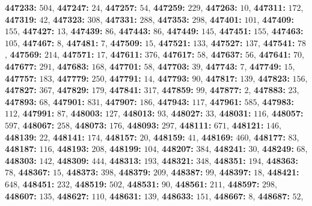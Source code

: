 \textsf{\bfseries 447233:} $504$, \textsf{\bfseries 447247:} $24$, \textsf{\bfseries 447257:} $54$, \textsf{\bfseries 447259:} $229$, \textsf{\bfseries 447263:} $10$, \textsf{\bfseries 447311:} $172$, \textsf{\bfseries 447319:} $42$, \textsf{\bfseries 447323:} $308$, \textsf{\bfseries 447331:} $288$, \textsf{\bfseries 447353:} $298$, \textsf{\bfseries 447401:} $101$, \textsf{\bfseries 447409:} $155$, \textsf{\bfseries 447427:} $13$, \textsf{\bfseries 447439:} $86$, \textsf{\bfseries 447443:} $86$, \textsf{\bfseries 447449:} $145$, \textsf{\bfseries 447451:} $155$, \textsf{\bfseries 447463:} $105$, \textsf{\bfseries 447467:} $8$, \textsf{\bfseries 447481:} $7$, \textsf{\bfseries 447509:} $15$, \textsf{\bfseries 447521:} $133$, \textsf{\bfseries 447527:} $137$, \textsf{\bfseries 447541:} $78$, \textsf{\bfseries 447569:} $214$, \textsf{\bfseries 447571:} $17$, \textsf{\bfseries 447611:} $376$, \textsf{\bfseries 447617:} $58$, \textsf{\bfseries 447637:} $56$, \textsf{\bfseries 447641:} $70$, \textsf{\bfseries 447677:} $291$, \textsf{\bfseries 447683:} $168$, \textsf{\bfseries 447701:} $58$, \textsf{\bfseries 447703:} $39$, \textsf{\bfseries 447743:} $7$, \textsf{\bfseries 447749:} $15$, \textsf{\bfseries 447757:} $183$, \textsf{\bfseries 447779:} $250$, \textsf{\bfseries 447791:} $14$, \textsf{\bfseries 447793:} $90$, \textsf{\bfseries 447817:} $139$, \textsf{\bfseries 447823:} $156$, \textsf{\bfseries 447827:} $367$, \textsf{\bfseries 447829:} $179$, \textsf{\bfseries 447841:} $317$, \textsf{\bfseries 447859:} $99$, \textsf{\bfseries 447877:} $2$, \textsf{\bfseries 447883:} $23$, \textsf{\bfseries 447893:} $68$, \textsf{\bfseries 447901:} $831$, \textsf{\bfseries 447907:} $186$, \textsf{\bfseries 447943:} $117$, \textsf{\bfseries 447961:} $585$, \textsf{\bfseries 447983:} $112$, \textsf{\bfseries 447991:} $87$, \textsf{\bfseries 448003:} $127$, \textsf{\bfseries 448013:} $93$, \textsf{\bfseries 448027:} $33$, \textsf{\bfseries 448031:} $116$, \textsf{\bfseries 448057:} $597$, \textsf{\bfseries 448067:} $258$, \textsf{\bfseries 448073:} $176$, \textsf{\bfseries 448093:} $297$, \textsf{\bfseries 448111:} $671$, \textsf{\bfseries 448121:} $146$, \textsf{\bfseries 448139:} $22$, \textsf{\bfseries 448141:} $174$, \textsf{\bfseries 448157:} $20$, \textsf{\bfseries 448159:} $41$, \textsf{\bfseries 448169:} $460$, \textsf{\bfseries 448177:} $83$, \textsf{\bfseries 448187:} $116$, \textsf{\bfseries 448193:} $208$, \textsf{\bfseries 448199:} $104$, \textsf{\bfseries 448207:} $384$, \textsf{\bfseries 448241:} $30$, \textsf{\bfseries 448249:} $68$, \textsf{\bfseries 448303:} $142$, \textsf{\bfseries 448309:} $444$, \textsf{\bfseries 448313:} $193$, \textsf{\bfseries 448321:} $348$, \textsf{\bfseries 448351:} $194$, \textsf{\bfseries 448363:} $78$, \textsf{\bfseries 448367:} $15$, \textsf{\bfseries 448373:} $398$, \textsf{\bfseries 448379:} $209$, \textsf{\bfseries 448387:} $99$, \textsf{\bfseries 448397:} $18$, \textsf{\bfseries 448421:} $648$, \textsf{\bfseries 448451:} $232$, \textsf{\bfseries 448519:} $502$, \textsf{\bfseries 448531:} $90$, \textsf{\bfseries 448561:} $211$, \textsf{\bfseries 448597:} $298$, \textsf{\bfseries 448607:} $135$, \textsf{\bfseries 448627:} $110$, \textsf{\bfseries 448631:} $139$, \textsf{\bfseries 448633:} $151$, \textsf{\bfseries 448667:} $8$, \textsf{\bfseries 448687:} $52$, 
